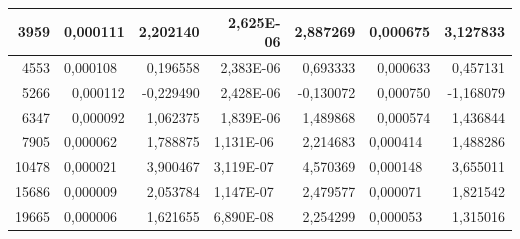 \documentclass[14pt]{article}
\begin{document}
\begin{table}[H]
\begin{tabular}{|r|r|r|r|r|r|r|}
3959                        & 0,000111                      & 2,202140                  & 2,625E-06                      & 2,887269                  & 0,000675                      & 3,127833                    \\ \hline
4553                        & \multicolumn{1}{l|}{0,000108} & 0,196558                  & 2,383E-06                      & 0,693333                  & 0,000633                      & 0,457131                    \\ \hline
5266                        & 0,000112                      & -0,229490                 & 2,428E-06                      & -0,130072                 & 0,000750                      & -1,168079                   \\ \hline
6347                        & 0,000092                      & 1,062375                  & 1,839E-06                      & 1,489868                  & 0,000574                      & 1,436844                    \\ \hline
7905  & \multicolumn{1}{l|}{0,000062} & 1,788875                  & \multicolumn{1}{l|}{1,131E-06} & 2,214683                  & \multicolumn{1}{l|}{0,000414} & 1,488286                    \\ \hline
\multicolumn{1}{|l|}{10478} & \multicolumn{1}{l|}{0,000021} & 3,900467                  & \multicolumn{1}{l|}{3,119E-07} & 4,570369                  & \multicolumn{1}{l|}{0,000148} & 3,655011                    \\ \hline
\multicolumn{1}{|l|}{15686} & \multicolumn{1}{l|}{0,000009} & 2,053784                  & \multicolumn{1}{l|}{1,147E-07} & 2,479577                  & \multicolumn{1}{l|}{0,000071} & 1,821542                    \\ \hline
\multicolumn{1}{|l|}{19665} & \multicolumn{1}{l|}{0,000006} & 1,621655                  & \multicolumn{1}{l|}{6,890E-08} & 2,254299                  & \multicolumn{1}{l|}{0,000053} & 1,315016                    \\ \hline
\end{tabular}

\end{table}
\newpage
\end{document}
